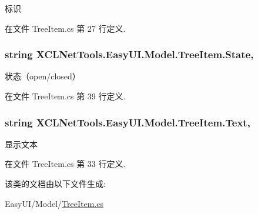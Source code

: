 标识 



在文件 Tree\-Item.\-cs 第 27 行定义.

\hypertarget{class_x_c_l_net_tools_1_1_easy_u_i_1_1_model_1_1_tree_item_a3b664ea234076c4f0ca6e550c5f7b106}{
\subsubsection[{State}]{\setlength{\rightskip}{0pt plus 5cm}string X\-C\-L\-Net\-Tools.\-Easy\-U\-I.\-Model.\-Tree\-Item.\-State\hspace{0.3cm}{\ttfamily [get]}, {\ttfamily [set]}}}\label{class_x_c_l_net_tools_1_1_easy_u_i_1_1_model_1_1_tree_item_a3b664ea234076c4f0ca6e550c5f7b106}


状态（open/closed） 



在文件 Tree\-Item.\-cs 第 39 行定义.

\hypertarget{class_x_c_l_net_tools_1_1_easy_u_i_1_1_model_1_1_tree_item_a02915b13c54f2f0980e9888209da0a17}{
\subsubsection[{Text}]{\setlength{\rightskip}{0pt plus 5cm}string X\-C\-L\-Net\-Tools.\-Easy\-U\-I.\-Model.\-Tree\-Item.\-Text\hspace{0.3cm}{\ttfamily [get]}, {\ttfamily [set]}}}\label{class_x_c_l_net_tools_1_1_easy_u_i_1_1_model_1_1_tree_item_a02915b13c54f2f0980e9888209da0a17}


显示文本 



在文件 Tree\-Item.\-cs 第 33 行定义.



该类的文档由以下文件生成\-:\begin{DoxyCompactItemize}
\item 
Easy\-U\-I/\-Model/\hyperlink{_tree_item_8cs}{Tree\-Item.\-cs}\end{DoxyCompactItemize}

